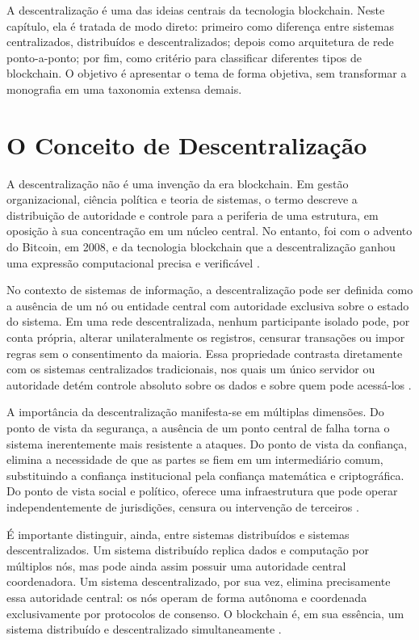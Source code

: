 \documentclass[12pt,a4paper]{report}
\begin{document}
A descentralização é uma das ideias centrais da tecnologia blockchain. Neste capítulo, ela é tratada de modo direto: primeiro como diferença entre sistemas centralizados, distribuídos e descentralizados; depois como arquitetura de rede ponto-a-ponto; por fim, como critério para classificar diferentes tipos de blockchain. O objetivo é apresentar o tema de forma objetiva, sem transformar a monografia em uma taxonomia extensa demais.

\section{O Conceito de Descentralização}

A descentralização não é uma invenção da era blockchain. Em gestão organizacional, ciência política e teoria de sistemas, o termo descreve a distribuição de autoridade e controle para a periferia de uma estrutura, em oposição à sua concentração em um núcleo central. No entanto, foi com o advento do Bitcoin, em 2008, e da tecnologia blockchain que a descentralização ganhou uma expressão computacional precisa e verificável \cite{Bashir2023}.

No contexto de sistemas de informação, a descentralização pode ser definida como a ausência de um nó ou entidade central com autoridade exclusiva sobre o estado do sistema. Em uma rede descentralizada, nenhum participante isolado pode, por conta própria, alterar unilateralmente os registros, censurar transações ou impor regras sem o consentimento da maioria. Essa propriedade contrasta diretamente com os sistemas centralizados tradicionais, nos quais um único servidor ou autoridade detém controle absoluto sobre os dados e sobre quem pode acessá-los \cite{Bashir2023}.

A importância da descentralização manifesta-se em múltiplas dimensões. Do ponto de vista da segurança, a ausência de um ponto central de falha torna o sistema inerentemente mais resistente a ataques. Do ponto de vista da confiança, elimina a necessidade de que as partes se fiem em um intermediário comum, substituindo a confiança institucional pela confiança matemática e criptográfica. Do ponto de vista social e político, oferece uma infraestrutura que pode operar independentemente de jurisdições, censura ou intervenção de terceiros \cite{Bashir2023}.

É importante distinguir, ainda, entre sistemas distribuídos e sistemas descentralizados. Um sistema distribuído replica dados e computação por múltiplos nós, mas pode ainda assim possuir uma autoridade central coordenadora. Um sistema descentralizado, por sua vez, elimina precisamente essa autoridade central: os nós operam de forma autônoma e coordenada exclusivamente por protocolos de consenso. O blockchain é, em sua essência, um sistema distribuído e descentralizado simultaneamente \cite{Bashir2023}.
\end{document}
